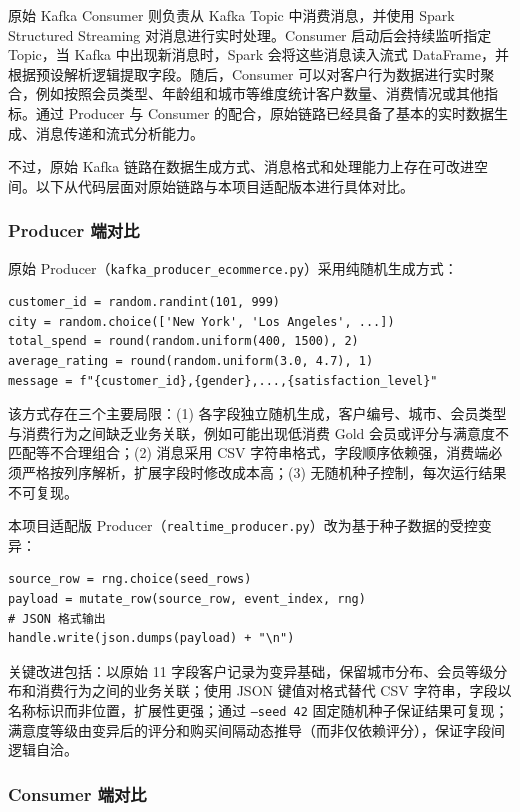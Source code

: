 \documentclass[12pt,hyperref,a4paper,UTF8]{ctexart}
\begin{document}
原始 Kafka Consumer 则负责从 Kafka Topic 中消费消息，并使用 Spark Structured Streaming 对消息进行实时处理。Consumer 启动后会持续监听指定 Topic，当 Kafka 中出现新消息时，Spark 会将这些消息读入流式 DataFrame，并根据预设解析逻辑提取字段。随后，Consumer 可以对客户行为数据进行实时聚合，例如按照会员类型、年龄组和城市等维度统计客户数量、消费情况或其他指标。通过 Producer 与 Consumer 的配合，原始链路已经具备了基本的实时数据生成、消息传递和流式分析能力。

不过，原始 Kafka 链路在数据生成方式、消息格式和处理能力上存在可改进空间。以下从代码层面对原始链路与本项目适配版本进行具体对比。

\subsubsection{Producer 端对比}

原始 Producer（\texttt{kafka\_producer\_ecommerce.py}）采用纯随机生成方式：

\begin{verbatim}
customer_id = random.randint(101, 999)
city = random.choice(['New York', 'Los Angeles', ...])
total_spend = round(random.uniform(400, 1500), 2)
average_rating = round(random.uniform(3.0, 4.7), 1)
message = f"{customer_id},{gender},...,{satisfaction_level}"
\end{verbatim}

该方式存在三个主要局限：(1) 各字段独立随机生成，客户编号、城市、会员类型与消费行为之间缺乏业务关联，例如可能出现低消费 Gold 会员或评分与满意度不匹配等不合理组合；(2) 消息采用 CSV 字符串格式，字段顺序依赖强，消费端必须严格按列序解析，扩展字段时修改成本高；(3) 无随机种子控制，每次运行结果不可复现。

本项目适配版 Producer（\texttt{realtime\_producer.py}）改为基于种子数据的受控变异：

\begin{verbatim}
source_row = rng.choice(seed_rows)
payload = mutate_row(source_row, event_index, rng)
# JSON 格式输出
handle.write(json.dumps(payload) + "\n")
\end{verbatim}

关键改进包括：以原始 11 字段客户记录为变异基础，保留城市分布、会员等级分布和消费行为之间的业务关联；使用 JSON 键值对格式替代 CSV 字符串，字段以名称标识而非位置，扩展性更强；通过 \texttt{--seed 42} 固定随机种子保证结果可复现；满意度等级由变异后的评分和购买间隔动态推导（而非仅依赖评分），保证字段间逻辑自洽。

\subsubsection{Consumer 端对比}
\end{document}
